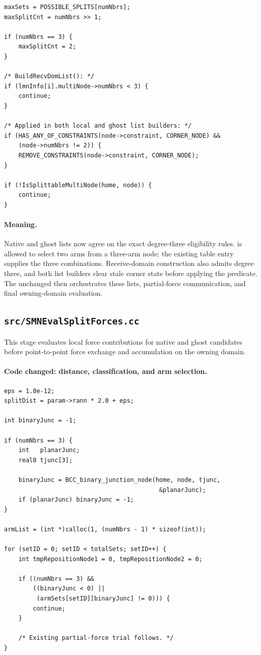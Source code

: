 \documentclass[11pt]{article}
\newcommand{\code}[1]{\texttt{\detokenize{#1}}}
\begin{document}
\begin{lstlisting}[style=cpp]
maxSets = POSSIBLE_SPLITS[numNbrs];
maxSplitCnt = numNbrs >> 1;

if (numNbrs == 3) {
    maxSplitCnt = 2;
}

/* BuildRecvDomList(): */
if (lmnInfo[i].multiNode->numNbrs < 3) {
    continue;
}

/* Applied in both local and ghost list builders: */
if (HAS_ANY_OF_CONSTRAINTS(node->constraint, CORNER_NODE) &&
    (node->numNbrs != 2)) {
    REMOVE_CONSTRAINTS(node->constraint, CORNER_NODE);
}

if (!IsSplittableMultiNode(home, node)) {
    continue;
}
\end{lstlisting}

\paragraph{Meaning.}
Native and ghost lists now agree on the exact degree-three eligibility rules.
\code{SMNGetArmSets()} is allowed to select two arms from a three-arm node;
the existing \code{POSSIBLE_SPLITS[3] == 3} table entry supplies the three
combinations.  Receive-domain construction also admits degree three, and both
list builders clear stale corner state before applying the predicate.  The
unchanged  then orchestrates these lists,
partial-force communication, and final owning-domain evaluation.

\subsection{\texttt{src/SMNEvalSplitForces.cc}}

This stage evaluates local force contributions for native and ghost
candidates before point-to-point force exchange and accumulation on the
owning domain.

\paragraph{Code changed: distance, classification, and arm selection.}

\begin{lstlisting}[style=cpp]
eps = 1.0e-12;
splitDist = param->rann * 2.0 + eps;

int binaryJunc = -1;

if (numNbrs == 3) {
    int   planarJunc;
    real8 tjunc[3];

    binaryJunc = BCC_binary_junction_node(home, node, tjunc,
                                           &planarJunc);
    if (planarJunc) binaryJunc = -1;
}

armList = (int *)calloc(1, (numNbrs - 1) * sizeof(int));

for (setID = 0; setID < totalSets; setID++) {
    int tmpRepositionNode1 = 0, tmpRepositionNode2 = 0;

    if ((numNbrs == 3) &&
        ((binaryJunc < 0) ||
         (armSets[setID][binaryJunc] != 0))) {
        continue;
    }

    /* Existing partial-force trial follows. */
}
\end{lstlisting}
\end{document}
